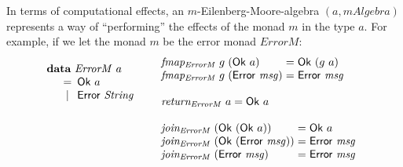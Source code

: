 \documentclass{jfp1}
\newcommand{\kw}[1]{\textbf{#1}}
\begin{document}
In terms of computational effects, an $m$-Eilenberg-Moore-algebra $(a,
\mathit{mAlgebra})$ represents a way of ``performing'' the effects of
the monad $m$ in the type $a$. For example, if we let the monad $m$ be the
error monad $\mathit{ErrorM}$:
\begin{displaymath}
  \begin{array}{ll}
    \begin{array}[t]{l}
      \kw{data}~\mathit{ErrorM}~a \\
      \quad
      \begin{array}{c@{\hspace{0.5em}}l}
        = & \mathsf{Ok}~a \\
        | & \mathsf{Error}~\mathit{String}
      \end{array}
    \end{array}
    &
    \begin{array}[t]{l}
      \begin{array}{@{}l@{\hspace{0.3em}}l@{\hspace{0.3em}}l@{\hspace{0.3em}}c@{\hspace{0.3em}}l}
        \mathit{fmap_{ErrorM}}&g&(\mathsf{Ok}~a) &=& \mathsf{Ok}~(g~a) \\
        \mathit{fmap_{ErrorM}}&g&(\mathsf{Error}~\mathit{msg}) &=& \mathsf{Error}~\mathit{msg} \\
      \end{array} \\
      \\
      \mathit{return_{ErrorM}}~a = \mathsf{Ok}~a \\
      \\
      \begin{array}{@{}l@{\hspace{0.3em}}l@{\hspace{0.3em}}c@{\hspace{0.3em}}l}
        \mathit{join_{ErrorM}}&(\mathsf{Ok}~(\mathsf{Ok}~a)) &=& \mathsf{Ok}~a \\
        \mathit{join_{ErrorM}}&(\mathsf{Ok}~(\mathsf{Error}~\mathit{msg})) &=& \mathsf{Error}~\mathit{msg} \\
        \mathit{join_{ErrorM}}&(\mathsf{Error}~\mathit{msg}) &=& \mathsf{Error}~\mathit{msg}
      \end{array}
    \end{array}
  \end{array}
\end{displaymath}
\end{document}
